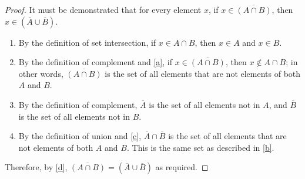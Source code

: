 \begin{proof} It must be demonstrated that for every element $x$, if $x \in \overline{(A \cap B)}$, then $ x \in (\overline{A} \cup \overline{B}) $.
	\begin{enumerate}[label=\textbf{\Roman*}]
		\item \label{a} By the definition of set intersection, if $ x \in A \cap B $, then $ x \in A $ and $ x \in B $.
		\item \label{b} By the definition of complement and \ref{a}, if $ x \in \overline{(A \cap B)} $, then $ x \notin A \cap B $; in other words, $ \overline{(A \cap B)} $ is the set of all elements that are not elements of both $ A $ and $ B $.
		\item \label{c} By the definition of complement, $ \overline{A} $ is the set of all elements not in $ A $, and $\overline{B} $ is the set of all elements not in $ B $.
		\item \label{d} By the definition of union and \ref{c}, $ \overline{A} \cap \overline{B} $ is the set of all elements that are not elements of both $ A $ and $ B $. This is the same set as described in \ref{b}.
	\end{enumerate}
	Therefore, by \ref{d}, $ \overline{(A \cap B)} = (\overline{A} \cup \overline{B}) $ as required.
\end{proof}